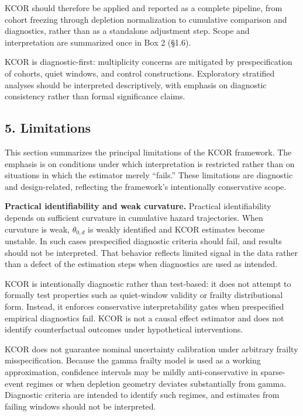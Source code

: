 \documentclass[
]{article}
\begin{document}
KCOR should therefore be applied and reported as a complete pipeline,
from cohort freezing through depletion normalization to cumulative
comparison and diagnostics, rather than as a standalone adjustment step.
Scope and interpretation are summarized once in Box 2 (§1.6).

KCOR is diagnostic-first: multiplicity concerns are mitigated by
prespecification of cohorts, quiet windows, and control constructions.
Exploratory stratified analyses should be interpreted descriptively,
with emphasis on diagnostic consistency rather than formal significance
claims.

\subsection{5. Limitations}\label{limitations}

This section summarizes the principal limitations of the KCOR framework.
The emphasis is on conditions under which interpretation is restricted
rather than on situations in which the estimator merely ``fails.'' These
limitations are diagnostic and design-related, reflecting the
framework's intentionally conservative scope.

\textbf{Practical identifiability and weak curvature.} Practical
identifiability depends on sufficient curvature in cumulative hazard
trajectories. When curvature is weak, \(\theta_{0,d}\) is weakly
identified and KCOR estimates become unstable. In such cases
prespecified diagnostic criteria should fail, and results should not be
interpreted. That behavior reflects limited signal in the data rather
than a defect of the estimation steps when diagnostics are used as
intended.

KCOR is intentionally diagnostic rather than test-based: it does not
attempt to formally test properties such as quiet-window validity or
frailty distributional form. Instead, it enforces conservative
interpretability gates when prespecified empirical diagnostics fail.
KCOR is not a causal effect estimator and does not identify
counterfactual outcomes under hypothetical interventions.

KCOR does not guarantee nominal uncertainty calibration under arbitrary
frailty misspecification. Because the gamma frailty model is used as a
working approximation, confidence intervals may be mildly
anti-conservative in sparse-event regimes or when depletion geometry
deviates substantially from gamma. Diagnostic criteria are intended to
identify such regimes, and estimates from failing windows should not be
interpreted.
\end{document}
